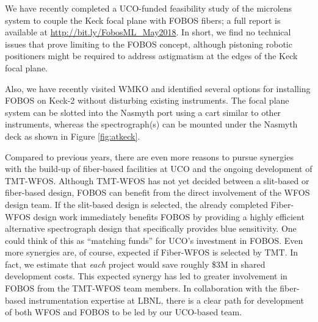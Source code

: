 \documentclass[11pt,letterpaper]{article}
\newcommand\micron{\mbox{$\mu$m}}%
\begin{document}
 We have
recently completed a UCO-funded feasibility study of the microlens
system to couple the Keck focal plane with FOBOS fibers; a full report
is available at \url{http://bit.ly/FobosML_May2018}.  In short, we find
no technical issues that prove limiting to the FOBOS concept, although
pistoning robotic positioners might be required to address astigmatism
at the edges of the Keck focal plane.

Also, we have recently visited WMKO and identified several options for
installing FOBOS on Keck-2 without disturbing existing instruments.  The
focal plane system can be slotted into the Nasmyth port using a cart
similar to other instruments, whereas the spectrograph(s) can be mounted
under the Nasmyth deck as shown in Figure \ref{fig:atkeck}.

Compared to previous years, there are even more reasons to
pursue synergies with the build-up of fiber-based facilities at UCO and
the ongoing development of TMT-WFOS.  Although TMT-WFOS has not yet
decided between a slit-based or fiber-based design, FOBOS can benefit
from the direct involvement of the WFOS design team.  If the slit-based
design is selected, the already completed Fiber-WFOS design work
immediately benefits FOBOS by providing a highly efficient alternative
spectrograph design that specifically provides blue sensitivity.  One could think of
this as ``matching funds'' for UCO's investment in FOBOS.  Even more
synergies are, of course, expected if Fiber-WFOS is selected by TMT.  In fact, we estimate that {\it each} project
would save roughly \$3M in shared development costs.  This expected synergy has
led to greater involvement in FOBOS from the TMT-WFOS team members.
In collaboration with the fiber-based instrumentation expertise at LBNL,
there is a clear path for development of both WFOS and FOBOS to be led by our UCO-based team. \medskip

\end{document}
